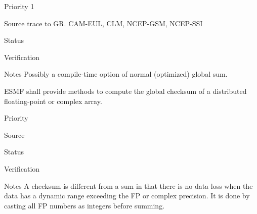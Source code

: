 \begin{reqlist}
\item[Priority] 1
\item[Source] trace to GR. CAM-EUL, CLM, NCEP-GSM, NCEP-SSI
\item[Status]
\item[Verification]
\item[Notes] Possibly a compile-time option of normal (optimized)
             global sum.
\end{reqlist}


ESMF shall provide methods to compute the global checksum of a
distributed floating-point or complex array. 

\begin{reqlist}
\item[Priority]
\item[Source]
\item[Status]
\item[Verification]
\item[Notes] A checksum is different from a sum in that there is no
  data loss when the data has a dynamic range exceeding the FP or
  complex precision. It is done by casting all FP numbers as integers
  before summing.
\end{reqlist}

%
%






